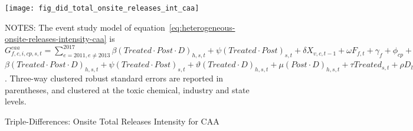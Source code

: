 \begin{figure}[H]
    \centering
    \texttt{[image: fig\_did\_total\_onsite\_releases\_int\_caa]}
    \caption{Triple-Differences: Onsite Total Releases Intensity for CAA}
    \label{fig:heterogeneous-onsite-releases-intensity-caa}
    \begin{minipage}{12cm}
        \vspace{0.05in}
        NOTES: The event study model of equation~\ref{eq:heterogeneous-onsite-releases-intensity-caa} is $G_{f,c,i,cp,s,t}^{caa} = \sum_{{e = 2011},{e \neq 2013}}^{2017} \beta (Treated \cdot Post \cdot D)_{h,s,t} + \psi (Treated \cdot Post)_{s,t} + \delta X_{v,c,t-1} + \omega F_{f,t} + \gamma_{f} + \phi_{cp} + \eta_{c,t} + \left[\lambda_{t} + \theta_{f,h} + \sigma_{s} + \zeta_{c} \right] + \varepsilon_{f,c,i,cp,s,t}$$\beta (Treated \cdot Post \cdot D)_{h,s,t} + \psi (Treated \cdot Post)_{s,t} + \vartheta (Treated \cdot D)_{h,s,t} + \mu (Post \cdot D)_{h,s,t} + \tau Treated_{s,t} + \rho D_{h,s,t} + \alpha Post_{t} + \delta X_{v,c,t-1} + \omega F_{f,t} + \gamma_{f} + \phi_{cp} + \eta_{c,t} + \left[\lambda_{t} + \theta_{h} + \sigma_{s} + \zeta_{c} \right] + \varepsilon_{f,c,i,cp,s,t}$. Three-way clustered robust standard errors are reported in parentheses, and clustered at the toxic chemical, industry and state levels.
    \end{minipage}
\end{figure}